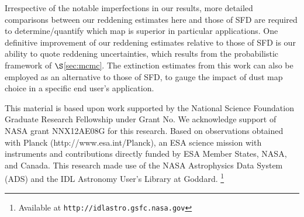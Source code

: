 \documentclass{emulateapj}
\begin{document}


Irrespective of the notable imperfections in our results, more detailed
comparisons between our reddening estimates here and those of SFD are required 
to determine/quantify which map is superior in particular applications. One 
definitive improvement of our reddening estimates relative to those of SFD is 
our ability to quote reddening uncertainties, which results from the 
probabilistic framework of $\S$\ref{sec:mcmc}. The extinction estimates 
from this work can also be employed as an alternative to those of SFD, to gauge
the impact of dust map choice in a specific end user's application.







This material is based upon work supported by the National Science Foundation 
Graduate Research Fellowship under Grant No. We acknowledge support of NASA 
grant NNX12AE08G for this research. Based on observations obtained with Planck 
(http://www.esa.int/Planck), an ESA science mission with instruments and 
contributions directly funded by ESA Member States, NASA, and Canada. This 
research made use of the NASA Astrophysics Data System (ADS) and the IDL 
Astronomy User's Library at Goddard. \footnote{Available at 
\texttt{http://idlastro.gsfc.nasa.gov}}



\end{document}
